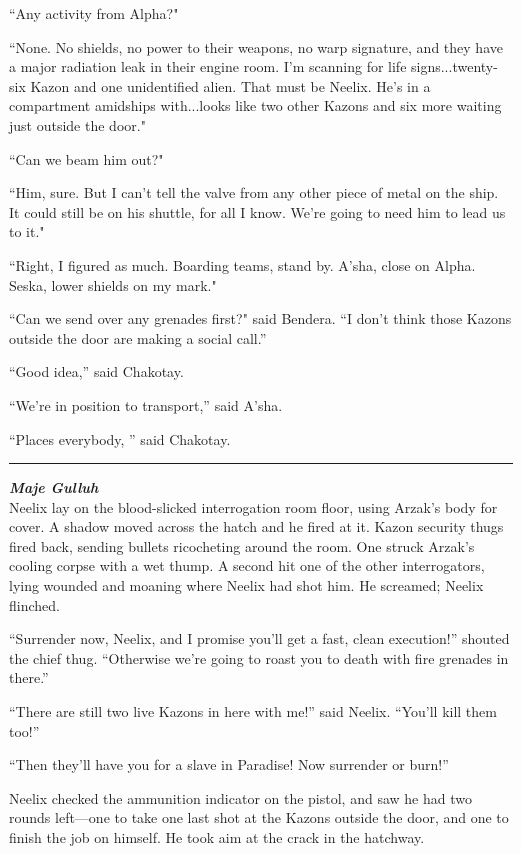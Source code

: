 \documentclass[twoside,letterpaper,12pt]{memoir}
\begin{document}
``Any activity from Alpha?"

``None. No shields, no power to their weapons, no warp signature, and they have a major radiation leak in their engine room. I'm scanning for life signs...twenty-six Kazon and one unidentified alien. That must be Neelix. He’s in a compartment amidships with...looks like two other Kazons and six more waiting just outside the door."

``Can we beam him out?"

``Him, sure. But I can’t tell the valve from any other piece of metal on the ship. It could still be on his shuttle, for all I know. We’re going to need him to lead us to it."

``Right, I figured as much. Boarding teams, stand by. A'sha, close on Alpha. Seska, lower shields on my mark."

``Can we send over any grenades first?" said Bendera. ``I don’t think those Kazons outside the door are making a social call.”

``Good idea,” said Chakotay.

``We’re in position to transport,” said A’sha.

``Places everybody, ” said Chakotay.

\fancybreak{\rule{3cm}{0.4 pt}}
\noindent\textit{\textbf{Maje Gulluh}}\\

Neelix lay on the blood-slicked interrogation room floor, using Arzak's body for cover. A shadow moved across the hatch and he fired at it. Kazon security thugs fired back, sending bullets ricocheting around the room. One struck Arzak’s cooling corpse with a wet thump. A second hit one of the other interrogators, lying wounded and moaning where Neelix had shot him. He screamed; Neelix flinched.

``Surrender now, Neelix, and I promise you’ll get a fast, clean execution!” shouted the chief thug. ``Otherwise we’re going to roast you to death with fire grenades in there.”

``There are still two live Kazons in here with me!” said Neelix. ``You’ll kill them too!”

``Then they’ll have you for a slave in Paradise! Now surrender or burn!”

Neelix checked the ammunition indicator on the pistol, and saw he had two rounds left—one to take one last shot at the Kazons outside the door, and one to finish the job on himself. He took aim at the crack in the hatchway.
\end{document}

